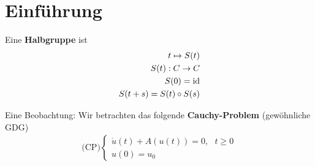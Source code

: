 
\setcounter{chapter}{-1}

\chapter{Einführung}
Eine \textbf{Halbgruppe} ist
\begin{align*}
t\mapsto S(t)\\
S(t):C\to C\\
S(0)=\text{id}\\
S(t+s)=S(t)\circ S(s)
\end{align*}

Eine Beobachtung: Wir betrachten das folgende \textbf{Cauchy-Problem} (gewöhnliche GDG)
\begin{align}\label{CauchyProblem0}
(\text{CP)}\left\lbrace\begin{array}{cl}
	\dot{u}(t)+A(u(t))=0,~~~t\geq0\\
	u(0) =u_0
\end{array}\right.
\end{align}

